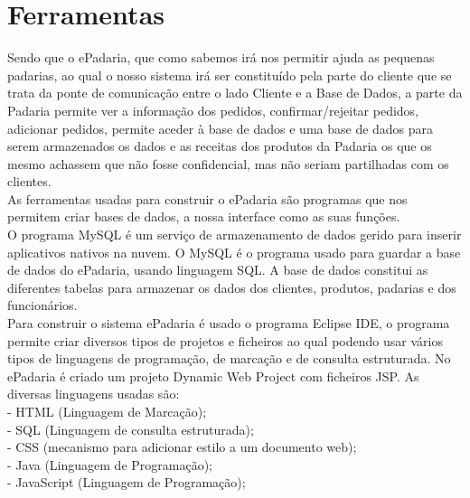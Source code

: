 \section{Ferramentas}
Sendo que o ePadaria, que como sabemos irá nos permitir ajuda as pequenas padarias, ao qual o nosso sistema irá ser constituído pela parte do cliente que se trata da ponte de comunicação entre o lado Cliente e a Base de Dados, a parte da Padaria permite ver a informação dos pedidos, confirmar/rejeitar pedidos, adicionar pedidos, permite aceder à base de dados e uma base de dados para serem armazenados os dados e as receitas dos produtos da Padaria os que os mesmo achassem que não fosse confidencial, mas não seriam partilhadas com os clientes.\\
As ferramentas usadas para construir o ePadaria são programas que nos permitem criar bases de dados, a nossa interface como as suas funções. \\
O programa MySQL é um serviço de armazenamento de dados gerido para inserir aplicativos nativos na nuvem. O MySQL é o programa usado para guardar a base de dados do ePadaria, usando linguagem SQL. A base de dados constitui as diferentes tabelas para armazenar os dados dos clientes, produtos, padarias e dos funcionários.\\
Para construir o sistema ePadaria é usado o programa Eclipse IDE, o programa permite criar diversos tipos de projetos e ficheiros ao qual podendo usar vários tipos de linguagens de programação, de marcação e de consulta estruturada. No ePadaria é criado um projeto Dynamic Web Project com ficheiros JSP. As diversas linguagens usadas são:\\
- HTML (Linguagem de Marcação);\\
- SQL (Linguagem de consulta estruturada);\\
- CSS (mecanismo para adicionar estilo a um documento web);\\
- Java (Linguagem de Programação);\\
- JavaScript (Linguagem de Programação);\\

